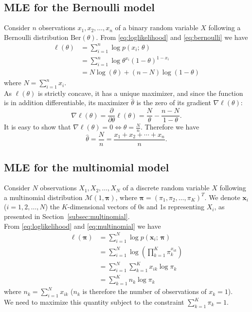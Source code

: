 \documentclass[12pt]{report}	%
\newcommand{\Ber}{\mathrm{Ber}}
\begin{document}
\subsection{MLE for the Bernoulli model}
Consider $n$ observations $x_1,x_2,\ldots,x_n$ of a binary random variable $X$ following a Bernoulli distribution $\Ber(\theta)$. From \eqref{eq:loglikelihood} and \eqref{eq:bernoulli} we have 
\begin{align*}
\ell(\theta) 	&= \sum_{i=1}^n \log p(x_i; \, \theta) \\
				&= \sum_{i=1}^n \log \theta^{x_i}(1-\theta)^{1-x_i}\\
				&= N\log(\theta)+(n-N)\log(1-\theta)
\end{align*} 
where $N=\sum_{i=1}^n x_i$.\\ 
As $\ell(\theta)$ is strictly concave, it has a unique maximizer, and since the function is in addition differentiable, its maximizer $\hat\theta$ is the zero of its gradient $\nabla \ell(\theta)$: 
$$\nabla \ell(\theta)=\frac{\partial}{\partial\theta} \ell(\theta) = \frac{N}{\theta}-\frac{n-N}{1-\theta}.$$  
It is easy to show that $\nabla \ell(\theta) = 0 \Longleftrightarrow \theta =\frac{N}{n}$. Therefore we have 
\begin{equation}
\hat{\theta} = \frac{N}{n} = \frac{x_1+x_2+\cdots+x_n}{n}.
\end{equation} 

\subsection{MLE for the multinomial model}
Consider $N$ observations $X_1,X_2,\ldots,X_N$ of a discrete random variable $X$ following a multinomial distribution $\mathcal{M}(1,\bm{\pi})$, where $\bm{\pi} = (\pi_1,\pi_2,\ldots,\pi_K)^T$. We denote $\mathbf{x}_i$ ($i=1,2,\ldots,N$) the $K$-dimensional vectors of 0s and 1s representing $X_i$, as presented in Section~\ref{subsec:multinomial}. \\
From  \eqref{eq:loglikelihood} and \eqref{eq:multinomial} we have
\begin{align*}
\ell(\bm{\pi}) 	&= \sum_{i=1}^N \log p(\mathbf{x}_i; \, \bm{\pi}) \\
				&= \sum_{i=1}^N \log \left( \prod_{k=1}^K\pi_k^{x_{ik}} \right)\\
				&= \sum_{i=1}^N \sum_{k=1}^K x_{ik} \log  \pi_k\\
				&= \sum_{k=1}^K n_k \log  \pi_k
\end{align*}
where $n_k=\sum_{i=1}^N x_{ik}$ ($n_k$ is therefore the number of observations of $x_k=1$).\\
We need to maximize this quantity subject to the constraint $\sum_{k=1}^K \pi_k = 1$.\\
\end{document}
